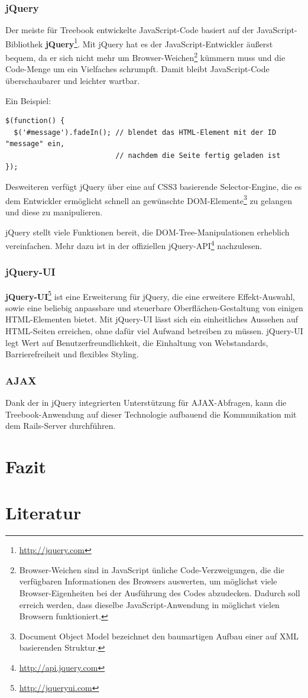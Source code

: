 \documentclass[10pt,a4paper]{book}
\begin{document}
\subsection{jQuery}
Der meiste für Treebook entwickelte JavaScript-Code basiert auf der JavaScript-Bibliothek \textbf{jQuery}\footnote{\href{http://jquery.com}{http://jquery.com}}. Mit jQuery hat es der JavaScript-Entwickler äußerst bequem, da er sich nicht mehr um Browser-Weichen\footnote{Browser-Weichen sind in JavaScript ünliche Code-Verzweigungen, die die verfügbaren Informationen des Browsers auswerten, um möglichst viele Browser-Eigenheiten bei der Ausführung des Codes abzudecken. Dadurch soll erreich werden, dass dieselbe JavaScript-Anwendung in möglichst vielen Browsern funktioniert.} kümmern muss und die Code-Menge um ein Vielfaches schrumpft. Damit bleibt JavaScript-Code überschaubarer und leichter wartbar.

Ein Beispiel:

\begin{footnotesize}
\begin{verbatim}
$(function() {
  $('#message').fadeIn(); // blendet das HTML-Element mit der ID "message" ein,
                          // nachdem die Seite fertig geladen ist
});
\end{verbatim}
\end{footnotesize}

Desweiteren verfügt jQuery über eine auf CSS3 basierende Selector-Engine, die es dem Entwickler ermöglicht schnell an gewünschte DOM-Elemente\footnote{Document Object Model bezeichnet den baumartigen Aufbau einer auf XML basierenden Struktur.} zu gelangen und diese zu manipulieren.

jQuery stellt viele Funktionen bereit, die DOM-Tree-Manipulationen erheblich vereinfachen. Mehr dazu ist in der offiziellen jQuery-API\footnote{\href{http://api.jquery.com}{http://api.jquery.com}} nachzulesen.

\subsection{jQuery-UI}
\textbf{jQuery-UI}\footnote{\href{http://jqueryui.com}{http://jqueryui.com}} ist eine Erweiterung für jQuery, die eine erweitere Effekt-Auswahl, sowie eine beliebig anpassbare und steuerbare Oberflächen-Gestaltung von einigen HTML-Elementen bietet.
Mit jQuery-UI lässt sich ein einheitliches Aussehen auf HTML-Seiten erreichen, ohne dafür viel Aufwand betreiben zu müssen. jQuery-UI legt Wert auf Benutzerfreundlichkeit, die Einhaltung von Webstandards, Barrierefreiheit und flexibles Styling.

\subsection{AJAX}
Dank der in jQuery integrierten Unterstützung für AJAX-Abfragen, kann die Treebook-Anwendung auf dieser Technologie aufbauend die Kommunikation mit dem Rails-Server durchführen.
\chapter{Fazit}

\chapter{Literatur}
\end{document}
